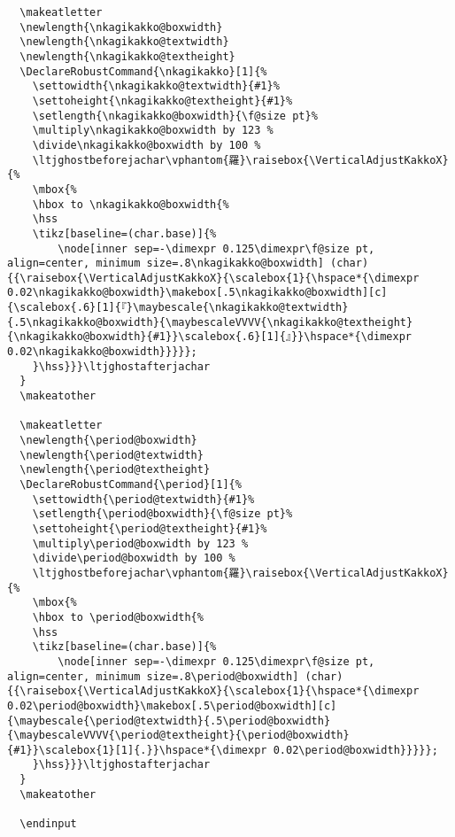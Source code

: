\documentclass[luatex,fontsize=10pt,paper=b5,twoside]{jlreq}%
\begin{document}
\begin{lstlisting}
  \makeatletter
  \newlength{\nkagikakko@boxwidth}
  \newlength{\nkagikakko@textwidth}
  \newlength{\nkagikakko@textheight}
  \DeclareRobustCommand{\nkagikakko}[1]{%
    \settowidth{\nkagikakko@textwidth}{#1}%
    \settoheight{\nkagikakko@textheight}{#1}%
    \setlength{\nkagikakko@boxwidth}{\f@size pt}%
    \multiply\nkagikakko@boxwidth by 123 %
    \divide\nkagikakko@boxwidth by 100 %
    \ltjghostbeforejachar\vphantom{羅}\raisebox{\VerticalAdjustKakkoX}{%
    \mbox{%
    \hbox to \nkagikakko@boxwidth{%
    \hss
    \tikz[baseline=(char.base)]{%
        \node[inner sep=-\dimexpr 0.125\dimexpr\f@size pt, align=center, minimum size=.8\nkagikakko@boxwidth] (char) {{\raisebox{\VerticalAdjustKakkoX}{\scalebox{1}{\hspace*{\dimexpr 0.02\nkagikakko@boxwidth}\makebox[.5\nkagikakko@boxwidth][c]{\scalebox{.6}[1]{『}\maybescale{\nkagikakko@textwidth}{.5\nkagikakko@boxwidth}{\maybescaleVVVV{\nkagikakko@textheight}{\nkagikakko@boxwidth}{#1}}\scalebox{.6}[1]{』}}\hspace*{\dimexpr 0.02\nkagikakko@boxwidth}}}}};
    }\hss}}}\ltjghostafterjachar
  }
  \makeatother

  \makeatletter
  \newlength{\period@boxwidth}
  \newlength{\period@textwidth}
  \newlength{\period@textheight}
  \DeclareRobustCommand{\period}[1]{%
    \settowidth{\period@textwidth}{#1}%
    \setlength{\period@boxwidth}{\f@size pt}%
    \settoheight{\period@textheight}{#1}%
    \multiply\period@boxwidth by 123 %
    \divide\period@boxwidth by 100 %
    \ltjghostbeforejachar\vphantom{羅}\raisebox{\VerticalAdjustKakkoX}{%
    \mbox{%
    \hbox to \period@boxwidth{%
    \hss
    \tikz[baseline=(char.base)]{%
        \node[inner sep=-\dimexpr 0.125\dimexpr\f@size pt, align=center, minimum size=.8\period@boxwidth] (char) {{\raisebox{\VerticalAdjustKakkoX}{\scalebox{1}{\hspace*{\dimexpr 0.02\period@boxwidth}\makebox[.5\period@boxwidth][c]{\maybescale{\period@textwidth}{.5\period@boxwidth}{\maybescaleVVVV{\period@textheight}{\period@boxwidth}{#1}}\scalebox{1}[1]{.}}\hspace*{\dimexpr 0.02\period@boxwidth}}}}};
    }\hss}}}\ltjghostafterjachar
  }
  \makeatother

  \endinput
\end{lstlisting}
\end{document}
